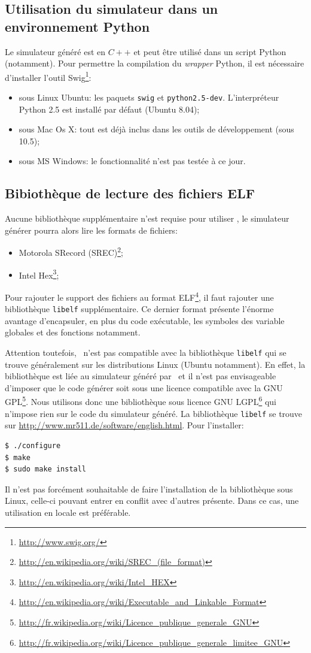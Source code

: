 \subsection{Utilisation du simulateur dans un environnement Python}
Le simulateur généré est en $C++$ et peut être utilisé dans un script Python (notamment). Pour permettre la compilation du \textit{wrapper} Python, il est nécessaire d'installer l'outil Swig\footnote{\url{http://www.swig.org/}}:
\begin{itemize}
\item sous Linux Ubuntu: les paquets \texttt{swig} et \texttt{python2.5-dev}. L'interpréteur Python 2.5 est installé par défaut (Ubuntu 8.04);
\item sous Mac Os X: tout est déjà inclus dans les outils de développement (sous 10.5);
\item sous MS Windows: le fonctionnalité n'est pas testée à ce jour.
\end{itemize}

\subsection{Bibiothèque de lecture des fichiers ELF}
\label{sec:elf}
Aucune bibliothèque supplémentaire n'est requise pour utiliser \gadl, le simulateur générer pourra alors lire les formats de fichiers:
\begin{itemize}
\item Motorola SRecord (SREC)\footnote{\url{http://en.wikipedia.org/wiki/SREC_(file_format)}};
\item Intel Hex\footnote{\url{http://en.wikipedia.org/wiki/Intel_HEX}};
\end{itemize}
Pour rajouter le support des fichiers au format ELF\footnote{\url{http://en.wikipedia.org/wiki/Executable_and_Linkable_Format}}, il faut rajouter une bibliothèque \texttt{libelf} supplémentaire. Ce dernier format présente l'énorme avantage d'encapsuler, en plus du code exécutable, les symboles des variable globales et des fonctions notamment. 

Attention toutefois, \gadl\ n'est pas compatible avec la bibliothèque \texttt{libelf} qui se trouve généralement sur les distributions Linux (Ubuntu notamment). En effet, la bibliothèque est liée au simulateur généré par \gadl\, et il n'est pas envisageable d'imposer que le code générer soit sous une licence compatible avec la GNU GPL\footnote{\url{http://fr.wikipedia.org/wiki/Licence\_publique\_generale\_GNU}}. Nous utilisons donc une bibliothèque sous licence GNU LGPL\footnote{\url{http://fr.wikipedia.org/wiki/Licence\_publique\_generale\_limitee\_GNU}} qui n'impose rien sur le code du simulateur généré. La bibliothèque \texttt{libelf} se trouve sur \url{http://www.mr511.de/software/english.html}. Pour l'installer:
\begin{verbatim}
$ ./configure
$ make
$ sudo make install
\end{verbatim}
Il n'est pas forcément souhaitable de faire l'installation de la bibliothèque sous Linux, celle-ci pouvant entrer en conflit avec d'autres présente. Dans ce cas, une utilisation en locale est préférable.

